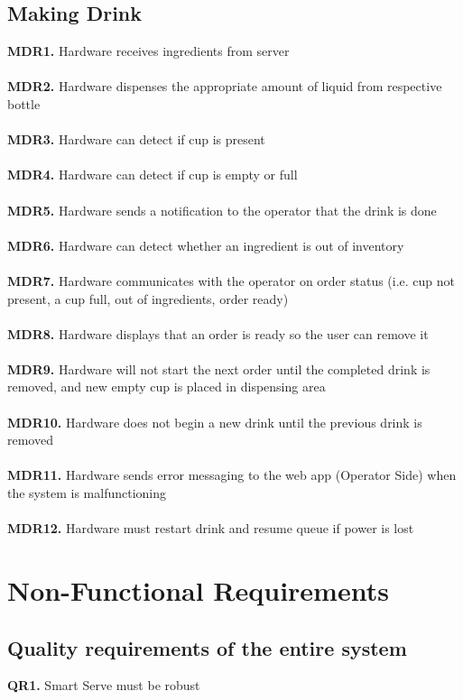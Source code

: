 \documentclass{article}
\begin{document}
\subsection{Making Drink}
    \noindent\textbf{MDR1.} Hardware receives ingredients from server \\\\
    \textbf{MDR2.} Hardware dispenses the appropriate amount of liquid from respective bottle \\\\
    \textbf{MDR3.} Hardware can detect if cup is present \\\\
    \textbf{MDR4.} Hardware can detect if cup is empty or full \\\\
    \textbf{MDR5.} Hardware sends a notification to the operator that the drink is done \\\\
    \textbf{MDR6.} Hardware can detect whether an ingredient is out of inventory \\\\
    \textbf{MDR7.} Hardware communicates with the operator on order status (i.e. cup not present, a cup full, out of ingredients, order ready) \\\\
    \textbf{MDR8.} Hardware displays that an order is ready so the user can remove it \\\\
    \textbf{MDR9.} Hardware will not start the next order until the completed drink is removed, and new empty cup is placed in dispensing area \\\\
    \textbf{MDR10.} Hardware does not begin a new drink until the previous drink is removed \\\\
    \textbf{MDR11.} Hardware sends error messaging to the web app (Operator Side) when the system is malfunctioning\\\\
    \textbf{MDR12.} Hardware must restart drink and resume queue if power is lost \\

\section{Non-Functional Requirements}
\subsection{Quality requirements of the entire system}
    \noindent\textbf{QR1.} Smart Serve must be robust\\ 
    
\end{document}
